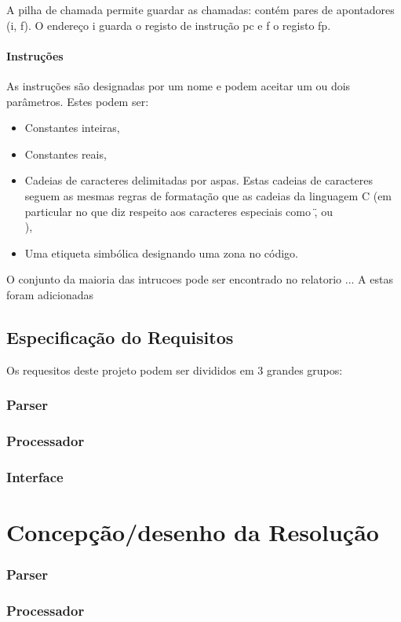 \documentclass{report}
\begin{document}
A pilha de chamada permite guardar as chamadas: contém pares de apontadores
(i, f). O endereço i guarda o registo de instrução pc e f o registo fp.

\subsubsection{Instruções}

\quad As instruções são designadas por um nome e podem aceitar um ou dois parâmetros. Estes podem ser:
\begin{itemize}
\item Constantes inteiras,
\item Constantes reais,
\item Cadeias de caracteres delimitadas por aspas. Estas cadeias de caracteres seguem as
mesmas regras de formatação que as cadeias da linguagem C (em particular no que
diz respeito aos caracteres especiais como \", \n ou \\ ),
\item Uma etiqueta simbólica designando uma zona no código.
\end{itemize}

\quad O conjunto da maioria das intrucoes pode ser encontrado no relatorio ...
A estas foram adicionadas

\section{Especificação do Requisitos}
Os requesitos deste projeto podem ser divididos em 3 grandes grupos:
\subsection{Parser}
\subsection{Processador}
\subsection{Interface}

\chapter{Concepção/desenho da Resolução}
\subsection{Parser}
\subsection{Processador}
\end{document}
